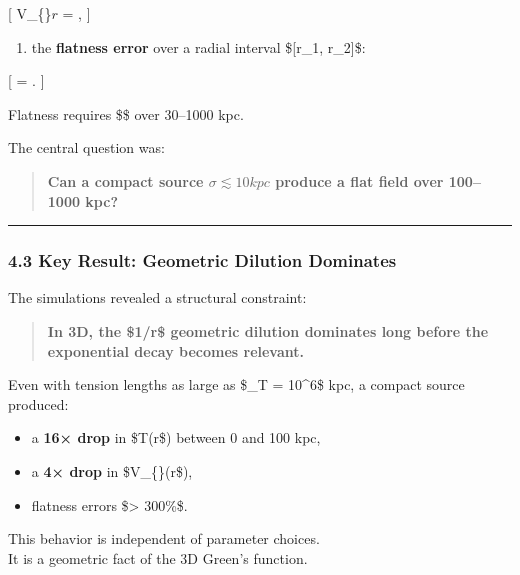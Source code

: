 {[} V\_\{\}\(r\) = ,  {]}

\begin{enumerate}
\def\labelenumi{\arabic{enumi}.}
\setcounter{enumi}{2}
\tightlist
\item
  the \textbf{flatness error} over a radial interval \${[}r\_1,
  r\_2{]}\$:
\end{enumerate}

{[} \epsilon =
.
 {]}

Flatness requires \$\epsilon {}\$ over 30--1000 kpc.

The central question was:

\begin{quote}
\textbf{Can a compact source \(σ ≲ 10 kpc\) produce a flat field over
100--1000 kpc?}
\end{quote}

\begin{center}\rule{0.5\linewidth}{0.5pt}\end{center}

\subsubsection{4.3 Key Result: Geometric Dilution
Dominates}\label{key-result-geometric-dilution-dominates}

The simulations revealed a structural constraint:

\begin{quote}
\textbf{In 3D, the \$1/r\$ geometric dilution dominates long before the
exponential decay becomes relevant.}
\end{quote}

Even with tension lengths as large as \$\ell\_T = 10\^{}6\$ kpc, a
compact source produced:

\begin{itemize}
\tightlist
\item
  a \textbf{16× drop} in \$T(r\$) between 0 and 100 kpc,
\item
  a \textbf{4× drop} in \$V\_\{\}(r\$),
\item
  flatness errors \$\epsilon \textgreater{} 300\%\$.
\end{itemize}

This behavior is independent of parameter choices.\\
It is a geometric fact of the 3D Green's function.

